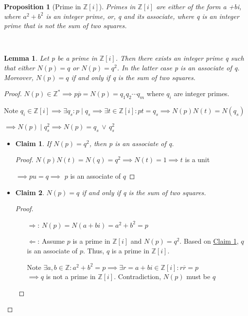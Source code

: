 \documentclass{article}
\newtheorem*{lem}{Lemma}
\newtheorem*{prop}{Proposition}
\newtheorem{claim}{Claim}
\theoremstyle{definition}\newtheorem{definition}{Definition}
\begin{document}
	\begin{prop}[Prime in ${\mathbb Z [i] }$]
		Primes in ${\mathbb Z [i] }$ are either of the form a +bi, where $a^2 +b^2$ is an integer prime, or, q and its associate, where q is an integer prime that is not the sum of two squares.
	\end{prop}

\

	\begin{lem}
		Let p be a prime in ${\mathbb Z [i] }$. Then there exists an integer prime q such that either $N (p) = q$ or $N (p) = q^2$. In the latter case p is an associate of q. Moreover, $N (p) = q$ if and only if q is the sum of two squares.
	\end{lem}
	\begin{proof}
		$N(p) \in \mathbb{Z}^* \implies p \overline {p} = N(p)=q_1q_2\cdots q_m$ where $q_i$ are integer primes. 
		
		Note $q_i \in {\mathbb Z [i] } \implies \exists q_s : p \mid q_s \implies \exists t \in {\mathbb Z [i] } : pt=q_s \implies N(p) N(t)= N(q_s) $
		
		$\implies N(p) \mid q_s^2 \implies N(p)= q_s \, \lor \, q_s^2$
		

		\begin{itemize}\renewcommand{\labelitemi}{}
			\item 
				\begin{claim} \label{associate}
					If $N (p) = q^2$, then p is an associate of q.
				\end{claim}
				\begin{proof}\renewcommand{\qedsymbol}{$\blacksquare$}
					$N(p) N(t)= N(q)=q^2 \implies N(t)=1 \implies t$  is a unit
					
					$\implies pu=q \implies$ $p$ is an associate of $q$
				\end{proof}	
			\item 
				\begin{claim}
				$N (p) = q$ if and only if q is the sum of two squares.	
				\end{claim}
				\begin{proof}\renewcommand{\qedsymbol}{$\blacksquare$}\
					\begin{itemize}
						\item[$\Rightarrow$:]
							$N (p) = N(a+bi)=a^2+b^2=p$
						\item [$\Leftarrow$:]
							Assume $p$ is a prime in ${\mathbb Z [i] }$ and $N (p) = q^2$. Based on \hyperref[associate]{Claim 1}, $q$ is an associate of $p$. Thus, $q$ is a prime in ${\mathbb Z [i] }$.
							
							Note $\exists a,b \in \mathbb Z : a^2+b^2=p \implies \exists r=a+bi \in {\mathbb Z [i] } : r\overline {r}=p$\\
							$\implies q$ is not a prime in ${\mathbb Z [i] }$. Contradiction, $N(p)$ must be $q$
					\end{itemize}
				\end{proof}							
		\end{itemize}

	\end{proof}

		
\end{document}
